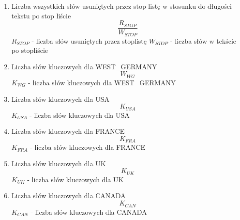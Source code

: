 \documentclass{classrep}
\begin{document}
\begin{enumerate}
  \item Liczba wszystkich słów usuniętych przez stop listę w stosunku do długości tekstu po stop liście
  \newline
  \begin{equation}
  	\frac{R_{STOP}}{W_{STOP}}
  \end{equation}
  \newline \quad $R_{STOP}$ - liczba słów usuniętych przez stoplistę 
  \newline \quad $W_{STOP}$ - liczba słów w tekście po stopliście
  
  \item Liczba słów kluczowych dla WEST\_GERMANY
  \newline
  \begin{equation}
  	W_{WG}
  \end{equation}
  \newline \quad $K_{WG}$ - liczba słów kluczowych dla WEST\_GERMANY
  
  \item Liczba słów kluczowych dla USA
  \newline
  \begin{equation}
  	K_{USA}
  \end{equation}
  \newline \quad $K_{USA}$ - liczba słów kluczowych dla USA
  
  
  \item Liczba słów kluczowych dla FRANCE
  \newline
  \begin{equation}
  	K_{FRA}
  \end{equation}
  \newline \quad $K_{FRA}$ - liczba słów kluczowych dla FRANCE
  
  
  \item Liczba słów kluczowych dla UK
  \newline
  \begin{equation}
  	K_{UK}
  \end{equation}
  \newline \quad $K_{UK}$ - liczba słów kluczowych dla UK
  
  
  \item Liczba słów kluczowych dla CANADA
  \newline
  \begin{equation}
  	K_{CAN}
  \end{equation}
  \newline \quad $K_{CAN}$ - liczba słów kluczowych dla CANADA
  

\end{enumerate}
\end{document}
